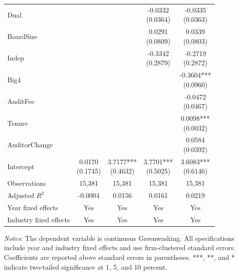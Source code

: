 \begin{table}[htbp]
{\begin{tabular}{@{}lcccc@{}}
Dual &  &  & \shortstack{-0.0332\\(0.0364)} & \shortstack{-0.0335\\(0.0363)}\\[4pt]
BoardSize &  &  & \shortstack{0.0291\\(0.0809)} & \shortstack{0.0339\\(0.0803)}\\[4pt]
Indep &  &  & \shortstack{-0.3342\\(0.2879)} & \shortstack{-0.2719\\(0.2872)}\\[4pt]
Big4 &  &  &  & \shortstack{-0.3604***\\(0.0960)}\\[4pt]
AuditFee &  &  &  & \shortstack{-0.0472\\(0.0467)}\\[4pt]
Tenure &  &  &  & \shortstack{0.0098***\\(0.0032)}\\[4pt]
AuditorChange &  &  &  & \shortstack{0.0584\\(0.0392)}\\[4pt]
Intercept & \shortstack{0.0170\\(0.1745)} & \shortstack{3.7177***\\(0.4632)} & \shortstack{3.7701***\\(0.5025)} & \shortstack{3.6083***\\(0.6146)}\\[4pt]
Observations & 15,381 & 15,381 & 15,381 & 15,381\\
Adjusted \(R^2\) & -0.0004 & 0.0156 & 0.0161 & 0.0219\\
Year fixed effects & Yes & Yes & Yes & Yes\\
Industry fixed effects & Yes & Yes & Yes & Yes\\
\hline\end{tabular}}
\vspace{0.4em}
\begin{minipage}{0.92\textwidth}\footnotesize\textit{Notes:} The dependent variable is continuous Greenwashing. All specifications include year and industry fixed effects and use firm-clustered standard errors. Coefficients are reported above standard errors in parentheses. ***, **, and * indicate two-tailed significance at 1, 5, and 10 percent.\end{minipage}
\end{table}